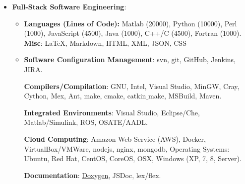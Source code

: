 \documentclass{article}
\begin{document}
\begin{itemize}
\begin{itemize}[leftmargin=*]

  \item \textbf{Full-Stack Software Engineering}: 
  \begin{itemize}
    \item \textbf{Languages (Lines of Code): } Matlab (20000), Python (10000), Perl (1000), JavaScript (4500), Java (1000), C++/C (4500), Fortran (1000). \textbf{Misc}: \LaTeX, Markdown, HTML, XML, JSON, CSS 

    \item \textbf{Software Configuration Management}: svn, git, GitHub, Jenkins, JIRA. 

\textbf{Compilers/Compilation}: GNU, Intel, Visual Studio, MinGW, Cray, Cython, Mex, Ant, make, cmake, catkin$\_$make, MSBuild, Maven. 

\textbf{Integrated Environments}: Visual Studio, Eclipse/Che, Matlab/Simulink, ROS, OSATE/AADL.

\textbf{Cloud Computing}: Amazon Web Service (AWS), Docker, VirtualBox/VMWare, nodejs, nginx, mongodb, Operating Systems: Ubuntu, Red Hat, CentOS, CoreOS, OSX, Windows (XP, 7, 8, Server).

\textbf{Documentation}: \href{http://www.doxygen.org}{Doxygen}, JSDoc, lex/flex.


\end{itemize}
\end{itemize}
\end{itemize}
\end{document}
